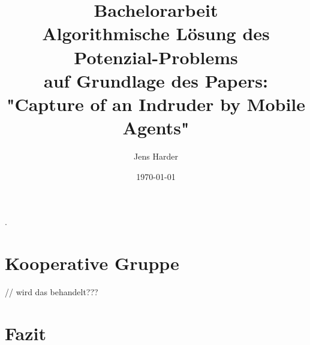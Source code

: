 \documentclass{article}
\title{Bachelorarbeit\\
	Algorithmische Lösung des Potenzial-Problems\\
	auf Grundlage des Papers:\\
	"Capture of an Indruder by Mobile Agents"}
\author{Jens Harder}
\date{\today}
\begin{document}
	\maketitle
	\newpage
	
	.
	\tableofcontents
	
	\newpage
	
	
	
	

	
	
	\section{Kooperative Gruppe}
	// wird das behandelt???
	
	\section{Fazit}
	
	
\end{document}
